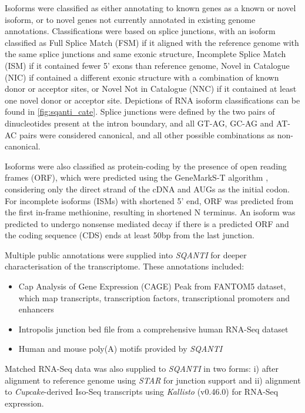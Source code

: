 Isoforms were classified as either annotating to known genes as a known or novel isoform, or to novel genes not currently annotated in existing genome annotations. Classifications were based on splice junctions, with an isoform classified as Full Splice Match (FSM) if it aligned with the reference genome with the same splice junctions and same exonic structure, Incomplete Splice Match (ISM) if it contained fewer 5’ exons than reference genome, Novel in Catalogue (NIC) if contained a different exonic structure with a combination of known donor or acceptor sites, or Novel Not in Catalogue (NNC) if it contained at least one novel donor or acceptor site. Depictions of RNA isoform classifications can be found in \cref{fig:sqanti_cate}. Splice junctions were defined by the two pairs of dinucleotides present at the intron boundary, and all GT-AG, GC-AG and AT-AC pairs were considered canonical, and all other possible combinations as non-canonical. 

Isoforms were also classified as protein-coding by the presence of open reading frames (ORF), which were predicted using the GeneMarkS-T algorithm \cite{Tang2015}, considering only the direct strand of the cDNA and AUGs as the initial codon. For incomplete isoforms (ISMs) with shortened 5' end, ORF was predicted from the first in-frame methionine, resulting in shortened N terminus. An isoform was predicted to undergo nonsense mediated decay if there is a predicted ORF and the coding sequence (CDS) ends at least 50bp from the last junction. 

Multiple public annotations were supplied into \textit{SQANTI} for deeper characterisation of the transcriptome. These annotations included:
\begin{itemize}
	\item Cap Analysis of Gene Expression (CAGE) Peak from FANTOM5 dataset, which map transcripts, transcription factors, transcriptional promoters and enhancers
	\item Intropolis junction bed file\cite{Nellore2016} from a comprehensive human RNA-Seq dataset
	\item Human and mouse poly(A) motifs provided by \textit{SQANTI}	 
\end{itemize}

Matched RNA-Seq data was also supplied to \textit{SQANTI} in two forms: i) after alignment to reference genome using \textit{STAR} for junction support and ii) alignment to \textit{Cupcake}-derived Iso-Seq transcripts using \textit{Kallisto} (v0.46.0)\cite{Bray2016} for RNA-Seq expression.  

